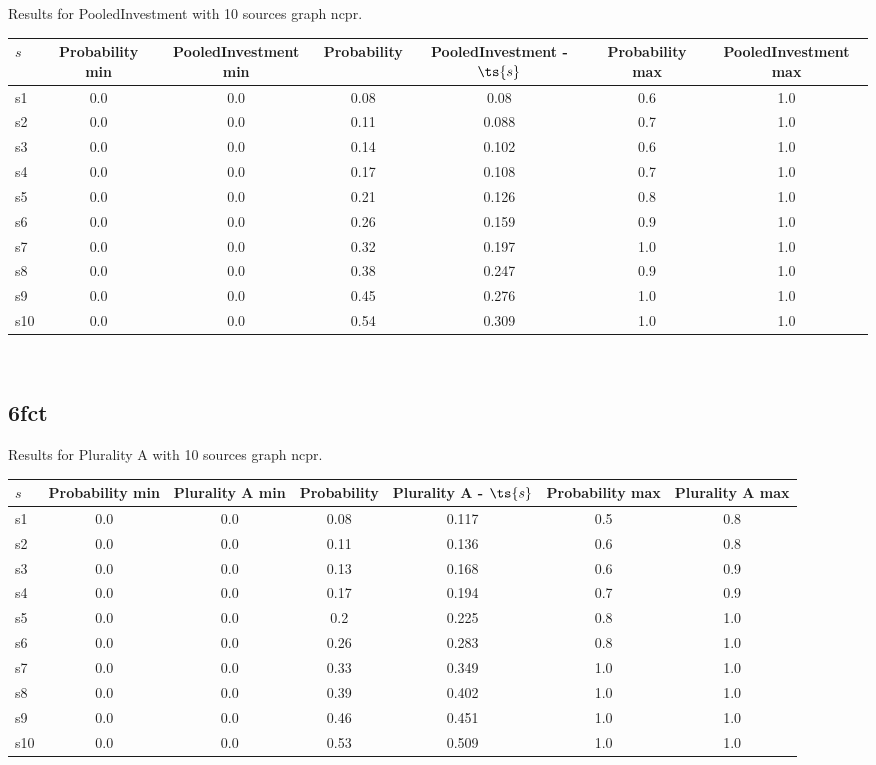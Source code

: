 \documentclass{article}
\begin{document}
\noindent Results for PooledInvestment with 10 sources graph ncpr.

\noindent\begin{tabular}{|l|c|c|c|c|c|c|}
\hline
$s$& Probability min & PooledInvestment min & Probability & PooledInvestment - $\ts{s}$ & Probability max & PooledInvestment max\\
\hline
s1 &0.0 & 0.0 & 0.08 & 0.08 & 0.6 & 1.0\\
\hline
s2 &0.0 & 0.0 & 0.11 & 0.088 & 0.7 & 1.0\\
\hline
s3 &0.0 & 0.0 & 0.14 & 0.102 & 0.6 & 1.0\\
\hline
s4 &0.0 & 0.0 & 0.17 & 0.108 & 0.7 & 1.0\\
\hline
s5 &0.0 & 0.0 & 0.21 & 0.126 & 0.8 & 1.0\\
\hline
s6 &0.0 & 0.0 & 0.26 & 0.159 & 0.9 & 1.0\\
\hline
s7 &0.0 & 0.0 & 0.32 & 0.197 & 1.0 & 1.0\\
\hline
s8 &0.0 & 0.0 & 0.38 & 0.247 & 0.9 & 1.0\\
\hline
s9 &0.0 & 0.0 & 0.45 & 0.276 & 1.0 & 1.0\\
\hline
s10 &0.0 & 0.0 & 0.54 & 0.309 & 1.0 & 1.0\\
\hline
\end{tabular}\\

\newpage

\subsection{6fct}

\noindent Results for Plurality A with 10 sources graph ncpr.

\noindent\begin{tabular}{|l|c|c|c|c|c|c|}
\hline
$s$& Probability min & Plurality A min & Probability & Plurality A - $\ts{s}$ & Probability max & Plurality A max\\
\hline
s1 &0.0 & 0.0 & 0.08 & 0.117 & 0.5 & 0.8\\
\hline
s2 &0.0 & 0.0 & 0.11 & 0.136 & 0.6 & 0.8\\
\hline
s3 &0.0 & 0.0 & 0.13 & 0.168 & 0.6 & 0.9\\
\hline
s4 &0.0 & 0.0 & 0.17 & 0.194 & 0.7 & 0.9\\
\hline
s5 &0.0 & 0.0 & 0.2 & 0.225 & 0.8 & 1.0\\
\hline
s6 &0.0 & 0.0 & 0.26 & 0.283 & 0.8 & 1.0\\
\hline
s7 &0.0 & 0.0 & 0.33 & 0.349 & 1.0 & 1.0\\
\hline
s8 &0.0 & 0.0 & 0.39 & 0.402 & 1.0 & 1.0\\
\hline
s9 &0.0 & 0.0 & 0.46 & 0.451 & 1.0 & 1.0\\
\hline
s10 &0.0 & 0.0 & 0.53 & 0.509 & 1.0 & 1.0\\
\hline
\end{tabular}\\
\end{document}
